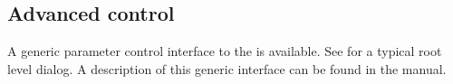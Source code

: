 \documentclass[11pt,a4paper,twoside]{article}
\newcommand{\+}{\discretionary{\mbox{\scriptsize$\hookleftarrow$}}{}{}}
\begin{document}

\subsection{Advanced control}\label{sec:advanced}

A generic parameter control interface to the \mha{} is available. See
 for a typical root level dialog.
%
A description of this generic interface can be found in the \mha{}
manual.




\printindex
\end{document}
